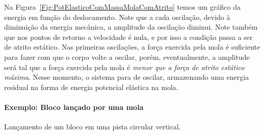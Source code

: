 Na Figura~\ref{Fig:PotElasticoComMassaMolaComAtrito} temos um gráfico da energia em função do deslocamento. Note que a cada oscilação, devido à diminuição da energia mecânica, a amplitude da oscilação diminui. Note também que nos pontos de retorno a velocidade é nula, e por isso a condição passa a ser de atrito estático. Nas primeiras oscilações, a força exercida pela mola é suficiente para fazer com que o corpo volte a oscilar, porém, eventualmente, a amplitude será tal que a força exercida pela mola é \emph{menor que a força de atrito estático máxima}. Nesse momento, o sistema para de oscilar, armazenando uma energia residual na forma de energia potencial elástica na mola.

\paragraph{Exemplo: Bloco lançado por uma mola}

\begin{marginfigure}[2cm]
\centering
{}
\caption{Lançamento de um bloco em uma pista circular vertical. \label{Fig:BlocoArremessadoEmLoopComAtrito}}
\end{marginfigure}


